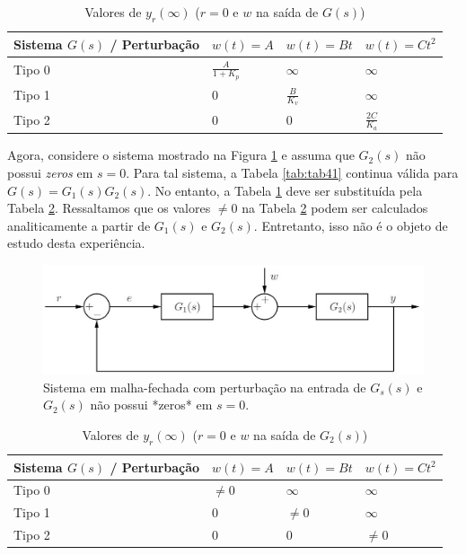 \documentclass[
]{book}
\begin{document}
\begin{table}

\caption{\label{tab:tab42}Valores de $y_r(\infty)$ ($r=0$ e $w$ na saída de $G(s)$)}
\centering
\begin{tabular}[t]{llll}
\toprule
Sistema $G(s)$ / Perturbação & $w(t)=A$ & $w(t) = Bt$ & $w(t) = Ct^2$\\
\midrule
Tipo 0 & $\frac{A}{1 + K_p}$ & $\infty$ & $\infty$\\
Tipo 1 & 0 & $\frac{B}{K_v}$ & $\infty$\\
Tipo 2 & 0 & 0 & $\frac{2C}{K_a}$\\
\bottomrule
\end{tabular}
\end{table}

Agora, considere o sistema mostrado na Figura \ref{fig:fig42} e assuma que \(G_2(s)\) não possui \emph{zeros} em \(s=0\). Para tal sistema, a Tabela \ref{tab:tab41} continua válida para \(G(s) = G_1(s)G_2(s)\). No entanto, a Tabela \ref{tab:tab42} deve ser substituída pela Tabela \ref{tab:tab43}. Ressaltamos que os valores \(\neq 0\) na Tabela \ref{tab:tab43} podem ser calculados analiticamente a partir de \(G_1(s) \text{ e } G_2(s)\). Entretanto, isso não é o objeto de estudo desta experiência.

\begin{figure}
\includegraphics[width=0.8\linewidth]{Imagens/Lab4/Apresentação/fig2} \caption{Sistema em malha-fechada com perturbação na entrada de $G_s(s)$ e $G_2(s)$ não possui *zeros* em $s=0$.}\label{fig:fig42}
\end{figure}

\begin{table}

\caption{\label{tab:tab43}Valores de $y_r(\infty)$ ($r=0$ e $w$ na saída de $G_2(s)$)}
\centering
\begin{tabular}[t]{llll}
\toprule
Sistema $G(s)$ / Perturbação & $w(t)=A$ & $w(t) = Bt$ & $w(t) = Ct^2$\\
\midrule
Tipo 0 & $\neq 0$ & $\infty$ & $\infty$\\
Tipo 1 & 0 & $\neq 0$ & $\infty$\\
Tipo 2 & 0 & 0 & $\neq 0$\\
\bottomrule
\end{tabular}
\end{table}
\end{document}
